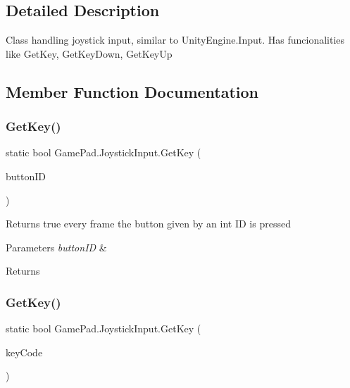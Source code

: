 \subsection{Detailed Description}
Class handling joystick input, similar to Unity\+Engine.\+Input. Has funcionalities like Get\+Key, Get\+Key\+Down, Get\+Key\+Up 



\subsection{Member Function Documentation}
\mbox{\label{class_game_pad_1_1_joystick_input_ae4523049ff819ce21db3c26e0b0982a0}} 
\subsubsection{\texorpdfstring{GetKey()}{GetKey()}\hspace{0.1cm}{\footnotesize\ttfamily [1/2]}}
{\footnotesize\ttfamily static bool Game\+Pad.\+Joystick\+Input.\+Get\+Key (\begin{DoxyParamCaption}\item[{int}]{button\+ID }\end{DoxyParamCaption})\hspace{0.3cm}{\ttfamily [static]}}



Returns true every frame the button given by an int ID is pressed 


\begin{DoxyParams}{Parameters}
{\em button\+ID} & \\
\hline
\end{DoxyParams}
\begin{DoxyReturn}{Returns}

\end{DoxyReturn}
\mbox{\label{class_game_pad_1_1_joystick_input_ae8057dc9f36ed897d7ee191608fe87c6}} 
\subsubsection{\texorpdfstring{GetKey()}{GetKey()}\hspace{0.1cm}{\footnotesize\ttfamily [2/2]}}
{\footnotesize\ttfamily static bool Game\+Pad.\+Joystick\+Input.\+Get\+Key (\begin{DoxyParamCaption}\item[{\mbox{\hyperlink{namespace_game_pad_ac76b16e8c3ac78facd993c355ab2c337}{Joystick\+Key\+Code}}}]{key\+Code }\end{DoxyParamCaption})\hspace{0.3cm}{\ttfamily [static]}}



